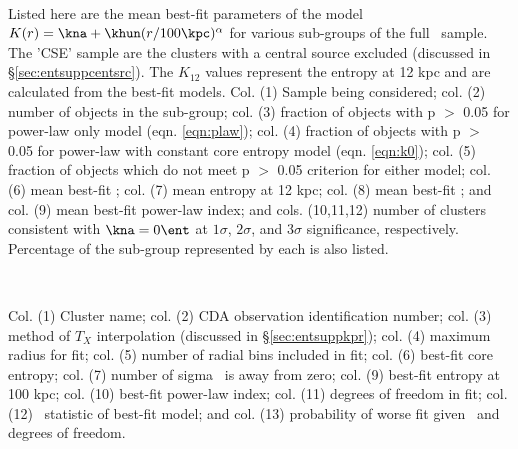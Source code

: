 \begin{center}
\\
\end{center}
Listed here are the mean best-fit parameters of the model $K(r) = \kna
+ \khun (r/100 \kpc)^{\alpha}$ for various sub-groups of the full
\accept\ sample. The 'CSE' sample are the clusters with a central
source excluded (discussed in \S\ref{sec:entsuppcentsrc}). The $K_{12}$
values represent the entropy at 12 kpc and are calculated from the
best-fit models. Col. (1) Sample being considered; col. (2) number of
objects in the sub-group; col. (3) fraction of objects with p $>$ 0.05
for power-law only model (eqn. \ref{eqn:plaw}); col. (4) fraction of
objects with p $>$ 0.05 for power-law with constant core entropy model
(eqn. \ref{eqn:k0}); col. (5) fraction of objects which do not meet p
$>$ 0.05 criterion for either model; col. (6) mean best-fit \kna;
col. (7) mean entropy at 12 kpc; col. (8) mean best-fit \khun; and
col. (9) mean best-fit power-law index; and cols. (10,11,12) number of
clusters consistent with $\kna = 0 \ent$ at $1\sigma$, $2\sigma$, and
$3\sigma$ significance, respectively. Percentage of the sub-group
represented by each is also listed.

\begin{center}
\\
\end{center}
Col. (1) Cluster name; col. (2) CDA observation identification number;
col. (3) method of $T_X$ interpolation (discussed in \S\ref{sec:entsuppkpr});
col. (4) maximum radius for fit; col. (5) number of radial bins
included in fit; col. (6) best-fit core entropy; col. (7) number of
sigma \kna\ is away from zero; col. (9) best-fit entropy at 100 kpc;
col. (10) best-fit power-law index; col. (11) degrees of freedom in
fit; col. (12) \chisq\ statistic of best-fit model; and col. (13)
probability of worse fit given \chisq\ and degrees of freedom.
